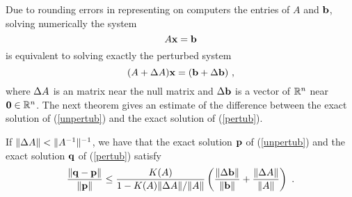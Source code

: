 Due to rounding errors in representing on computers the entries
of $A$ and $\mathbf{b}$, solving numerically the system
\begin{equation}\label{unpertub}
A\mathbf{x} = \mathbf{b}
\end{equation}
is equivalent to solving exactly the perturbed system
\begin{equation}\label{pertub}
(A+\Delta{A})\mathbf{x} = (\mathbf{b} + \Delta{\mathbf{b}}) \ ,
\end{equation}
where $\Delta{A}$ is an \nn matrix near the \nn null
matrix and $\Delta{\mathbf{b}}$ is a vector of $\mathbb{R}^n$ near $\mathbf{0}\in \mathbb{R}^n$.
The next theorem gives an estimate of the difference between the exact
solution of (\ref{unpertub}) and the exact solution of
(\ref{pertub}).

\begin{theorem}
If $\|\Delta{A}\| < \|A^{-1}\|^{-1}$, we have that
the exact solution $\mathbf{p}$ of (\ref{unpertub}) and the exact
solution $\mathbf{q}$ of (\ref{pertub}) satisfy
\[
\frac{\| \mathbf{q} - \mathbf{p} \|}{\| \mathbf{p} \|} \leq
\frac{K(A)}{1 - K(A) \|\Delta{A}\|/\|A\|}
\left( \frac{\|\Delta{\mathbf{b}}\|}{\|\mathbf{b}\|}
+ \frac{\|\Delta{A}\|}{\|A\|} \right) \ .
\]
\end{theorem}

